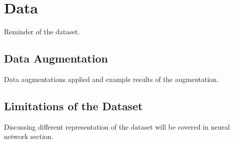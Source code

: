 \chapter{Data} \label{chap:data}
Reminder of the dataset.~\cite{openi} 

\section{Data Augmentation}
Data augmentations applied and example results of the augmentation.

\section{Limitations of the Dataset}

Discussing different representation of the dataset will be covered in neural network section.
\clearpage